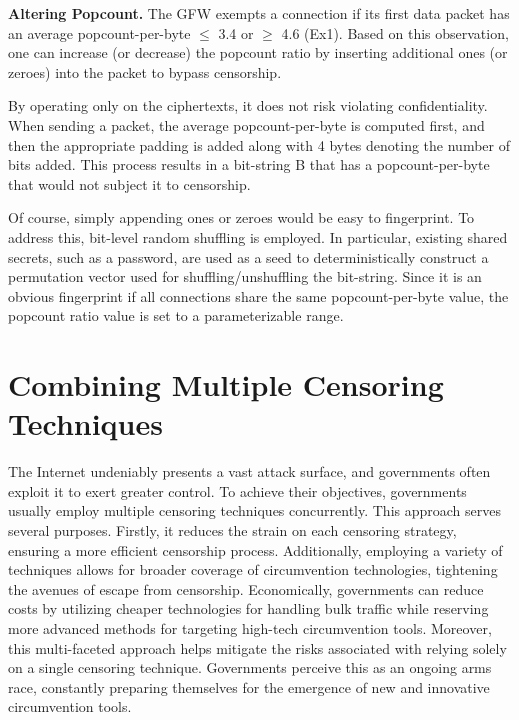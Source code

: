\textbf{Altering Popcount.} The GFW exempts a connection if its first data packet has an average popcount-per-byte ${\leq}$ 3.4 or ${\geq}$ 4.6 (Ex1). Based on this observation, one can increase (or decrease) the popcount ratio by inserting additional ones (or zeroes) into the packet to bypass censorship.

By operating only on the ciphertexts, it does not risk violating confidentiality. When sending a packet, the average popcount-per-byte is computed first, and then the appropriate padding is added along with 4 bytes denoting the number of bits added. This process results in a bit-string B that has a popcount-per-byte that would not subject it to censorship.

Of course, simply appending ones or zeroes would be easy to fingerprint. To address this, bit-level random shuffling is employed. In particular, existing shared secrets, such as a password, are used as a seed to deterministically construct a permutation vector used for shuffling/unshuffling the bit-string. Since it is an obvious fingerprint if all connections share the same popcount-per-byte value, the popcount ratio value is set to a parameterizable range.

\section{Combining Multiple Censoring Techniques}
The Internet undeniably presents a vast attack surface, and governments often exploit it to exert greater control. To achieve their objectives, governments usually employ multiple censoring techniques concurrently. This approach serves several purposes. Firstly, it reduces the strain on each censoring strategy, ensuring a more efficient censorship process. Additionally, employing a variety of techniques allows for broader coverage of circumvention technologies, tightening the avenues of escape from censorship. Economically, governments can reduce costs by utilizing cheaper technologies for handling bulk traffic while reserving more advanced methods for targeting high-tech circumvention tools. Moreover, this multi-faceted approach helps mitigate the risks associated with relying solely on a single censoring technique. Governments perceive this as an ongoing arms race, constantly preparing themselves for the emergence of new and innovative circumvention tools.

